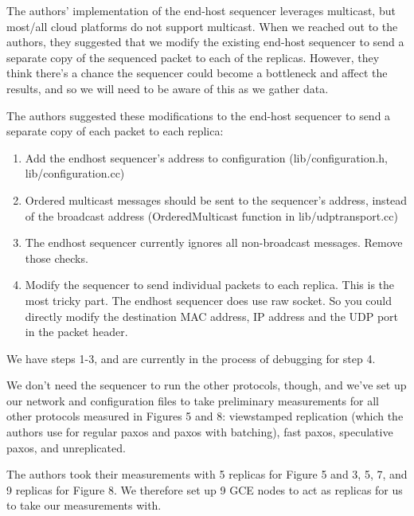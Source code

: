 The authors' implementation of the end-host sequencer leverages multicast, but most/all cloud platforms do not support multicast. When we reached out to the authors, they suggested that we modify the existing end-host sequencer to send a separate copy of the sequenced packet to each of the replicas. However, they think there's a chance the sequencer could become a bottleneck and affect the results, and so we will need to be aware of this as we gather data. 

The authors suggested these modifications to the end-host sequencer to send a separate copy of each packet to each replica:

\begin{enumerate}
  \item Add the endhost sequencer's address to configuration (lib/configuration.h, lib/configuration.cc)
  \item Ordered multicast messages should be sent to the sequencer's address, instead of the broadcast address (OrderedMulticast function in lib/udptransport.cc)
  \item The endhost sequencer currently ignores all non-broadcast messages. Remove those checks.
  \item Modify the sequencer to send individual packets to each replica. This is the most tricky part. The endhost sequencer does use raw socket. So you could directly modify the destination MAC address, IP address and the UDP port in the packet header.
\end{enumerate}

We have steps 1-3, and are currently in the process of debugging for step 4. 

We don't need the sequencer to run the other protocols, though, and we've set up our network and configuration files to take preliminary measurements for all other protocols measured in Figures 5 and 8: viewstamped replication\cite{vr} (which the authors use for regular paxos and paxos with batching), fast paxos, speculative paxos, and unreplicated.

The authors took their measurements with 5 replicas for Figure 5 and 3, 5, 7, and 9 replicas for Figure 8. We therefore set up 9 GCE nodes to act as replicas for us to take our measurements with. 

